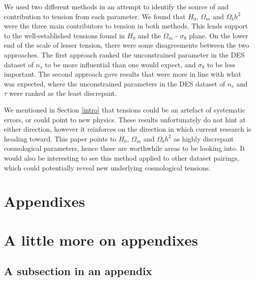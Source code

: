 \documentclass[%
 reprint,
 amsmath,amssymb,
 aps,
]{revtex4-2}
\begin{document}
We used two different methods in an attempt to identify the source of and contribution to tension from each parameter. We found that $H_0$, $\Omega_m$ and $\Omega_b h^2$ were the three main contributors to tension in both methods. This lends support to the well-established tensions found in $H_0$ and the $\Omega_m$ - $\sigma_8$ plane. On the lower end of the scale of lesser tension, there were some disagreements between the two approaches. The first approach ranked the unconstrained parameter in the DES dataset of $n_s$ to be more influential than one would expect, and $\sigma_8$ to be less important. The second approach gave results that were more in line with what was expected, where the unconstrained parameters in the DES dataset of $n_s$ and $\tau$ were ranked as the least discrepant.

We mentioned in Section \ref{intro} that tensions could be an artefact of systematic errors, or could point to new physics. These results unfortunately do not hint at either direction, however it reinforces on the direction in which current research is heading toward. This paper points to $H_0$, $\Omega_m$ and $\Omega_b h^2$ as highly discrepant cosmological parameters, hence these are worthwhile areas to be looking into. It would also be interesting to see this method applied to other dataset pairings, which could potentially reveal new underlying cosmological tensions.



\begin{acknowledgments}

\end{acknowledgments}

\appendix

\section{Appendixes}

\section{A little more on appendixes}


\subsection{\label{app:subsec}A subsection in an appendix}





\end{document}

